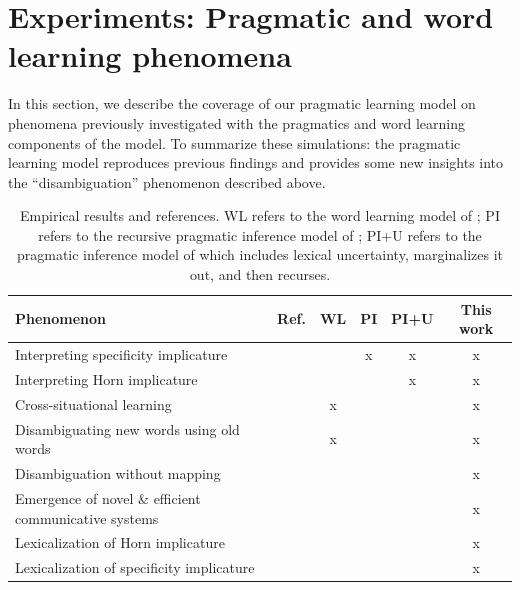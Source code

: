 \documentclass{article} %
\newcommand{\word}{\text{word}}
\newcommand{\obj}{\text{object}}
\newcommand{\lex}{\text{lexicon}}
\begin{document}
%
%
%
%
%

\section{Experiments: Pragmatic and word learning phenomena}

In this section, we describe the coverage of our pragmatic learning model on phenomena previously investigated with the pragmatics and word learning components of the model. To summarize these simulations: the pragmatic learning model reproduces previous findings and provides some new insights into the ``disambiguation'' phenomenon described above. 

\begin{table}[t]
\label{tab:results}
\begin{center}
\begin{tabular}{lccccc}
\toprule
Phenomenon & Ref. & WL & PI & PI+U & This work \\
\midrule
Interpreting specificity implicature & \cite{grice1975} &  & x &x & x\\
Interpreting Horn implicature & \cite{horn1984} & &  & x& x\\
Cross-situational learning & \cite{smith2008} & x& & & x \\
Disambiguating new words using old words & \cite{markman1988} &x  & & & x \\
Disambiguation without mapping & \cite{horst2008} &  & & & x \\
Emergence of novel \& efficient communicative systems & \cite{galantucci2005} & & & & x \\
Lexicalization of Horn implicature & \cite{horn1984} & & & & x \\
Lexicalization of specificity implicature & \cite{levinson2000} & & & & x \\
\hline
\end{tabular}
\end{center}
\caption{Empirical results and references. WL refers to the word learning model of \cite{frank2009}; PI refers to the recursive pragmatic inference model of \cite{frank2012}; PI+U refers to the pragmatic inference model of \cite{bergen2012} which includes lexical uncertainty, marginalizes it out, and then recurses.}
\end{table}
\end{document}
